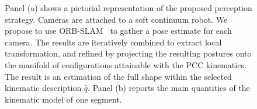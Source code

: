 \begin{figure}[ht]
     \centering
     \caption{ Panel (a) shows a pictorial representation of the proposed perception strategy. Cameras are attached to a soft continuum robot. We propose to use ORB-SLAM~\citep{mur2017orb} to gather a pose estimate for each camera. The results are iteratively combined to extract local transformation, and refined by projecting the resulting postures onto the manifold of configurations attainable with the \gls{PCC} kinematics. The result is an estimation of the full shape within the selected kinematic description $\hat{q}$. Panel (b) reports the main quantities of the kinematic model of one segment. }
\end{figure}
